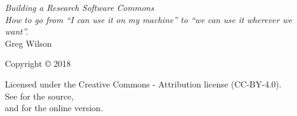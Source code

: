 \pagestyle{empty}

{\begingroup
  \raggedleft
  \vspace*{\baselineskip}


  {\Huge\itshape Building a Research Software Commons}\\[\baselineskip]

  {\large\itshape
    How to go from ``I can use it on my machine'' to ``we can use it wherever we want''.
  }\\[0.2\textheight]

  {\large Greg Wilson}\par

  \vfill

  {\large Copyright {\copyright} 2018}

  \vspace*{\baselineskip}

  {\small
    Licensed under the Creative Commons - Attribution license (CC-BY-4.0).
    \\
    See {\repository} for the source,\\
    and {\website} for the online version.
  }

\endgroup}

\newpage

\pagestyle{empty}

~

\newpage

\tableofcontents

\newpage

\pagestyle{empty}

~

\newpage

\pagestyle{plain}
